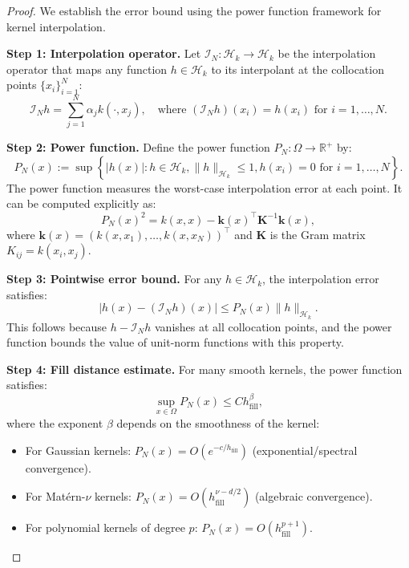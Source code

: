 \documentclass[11pt,a4paper]{article}
\newcommand{\R}{\mathbb{R}}
\newcommand{\RKHS}{\mathcal{H}_k}
\newcommand{\bK}{\mathbf{K}}
\begin{document}
\begin{proof}
We establish the error bound using the power function framework for kernel interpolation.

\textbf{Step 1: Interpolation operator.}
Let $\mathcal{I}_N: \RKHS \to \RKHS$ be the interpolation operator that maps any function $h \in \RKHS$ to its interpolant at the collocation points $\{x_i\}_{i=1}^N$:
\begin{equation}
\mathcal{I}_N h = \sum_{j=1}^N \alpha_j k(\cdot, x_j), \quad \text{where } (\mathcal{I}_N h)(x_i) = h(x_i) \text{ for } i = 1, \ldots, N.
\end{equation}

\textbf{Step 2: Power function.}
Define the power function $P_N: \Omega \to \R^+$ by:
\begin{equation}
P_N(x) := \sup\left\{|h(x)| : h \in \RKHS, \|h\|_{\RKHS} \leq 1, h(x_i) = 0 \text{ for } i = 1, \ldots, N\right\}.
\end{equation}
The power function measures the worst-case interpolation error at each point. It can be computed explicitly as:
\begin{equation}
P_N(x)^2 = k(x,x) - \mathbf{k}(x)^\top \bK^{-1} \mathbf{k}(x),
\end{equation}
where $\mathbf{k}(x) = (k(x, x_1), \ldots, k(x, x_N))^\top$ and $\bK$ is the Gram matrix $K_{ij} = k(x_i, x_j)$.

\textbf{Step 3: Pointwise error bound.}
For any $h \in \RKHS$, the interpolation error satisfies:
\begin{equation}
|h(x) - (\mathcal{I}_N h)(x)| \leq P_N(x) \|h\|_{\RKHS}.
\end{equation}
This follows because $h - \mathcal{I}_N h$ vanishes at all collocation points, and the power function bounds the value of unit-norm functions with this property.

\textbf{Step 4: Fill distance estimate.}
For many smooth kernels, the power function satisfies:
\begin{equation}
\sup_{x \in \Omega} P_N(x) \leq C h_{\mathrm{fill}}^\beta,
\end{equation}
where the exponent $\beta$ depends on the smoothness of the kernel:
\begin{itemize}
\item For Gaussian kernels: $P_N(x) = O(e^{-c/h_{\mathrm{fill}}})$ (exponential/spectral convergence).
\item For Mat\'{e}rn-$\nu$ kernels: $P_N(x) = O(h_{\mathrm{fill}}^{\nu - d/2})$ (algebraic convergence).
\item For polynomial kernels of degree $p$: $P_N(x) = O(h_{\mathrm{fill}}^{p+1})$.
\end{itemize}


\end{proof}
\end{document}
